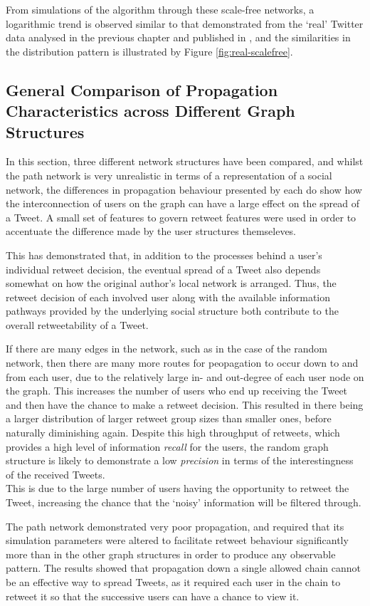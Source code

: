 From simulations of the algorithm through these scale-free networks, a logarithmic trend is observed similar to that demonstrated from the `real' Twitter data analysed in the previous chapter and published in \cite{webberley11}, and the similarities in the distribution pattern is illustrated by Figure \ref{fig:real-scalefree}.


\subsection{General Comparison of Propagation Characteristics across Different Graph Structures}
In this section, three different network structures have been compared, and whilst the path network is very unrealistic in terms of a representation of a social network, the differences in propagation behaviour presented by each do show how the interconnection of users on the graph can have a large effect on the spread of a Tweet. A small set of features to govern retweet features were used in order to accentuate the difference made by the user structures themseleves.

This has demonstrated that, in addition to the processes behind a user's individual retweet decision, the eventual spread of a Tweet also depends somewhat on how the original author's local network is arranged. Thus, the retweet decision of each involved user along with the available information pathways provided by the underlying social structure both contribute to the overall retweetability of a Tweet. 

If there are many edges in the network, such as in the case of the random network, then there are many more routes for peopagation to occur down to and from each user, due to the relatively large in- and out-degree of each user node on the graph. This increases the number of users who end up receiving the Tweet and then have the chance to make a retweet decision. This resulted in there being a larger distribution of larger retweet group sizes than smaller ones, before naturally diminishing again. Despite this high throughput of retweets, which provides a high level of information \textit{recall} for the users, the random graph structure is likely to demonstrate a low \textit{precision} in terms of the interestingness of the received Tweets.\\
This is due to the large number of users having the opportunity to retweet the Tweet, increasing the chance that the `noisy' information will be filtered through.

The path network demonstrated very poor propagation, and required that its simulation parameters were altered to facilitate retweet behaviour significantly more than in the other graph structures in order to produce any observable pattern. The results showed that propagation down a single allowed chain cannot be an effective way to spread Tweets, as it required each user in the chain to retweet it so that the successive users can have a chance to view it.


